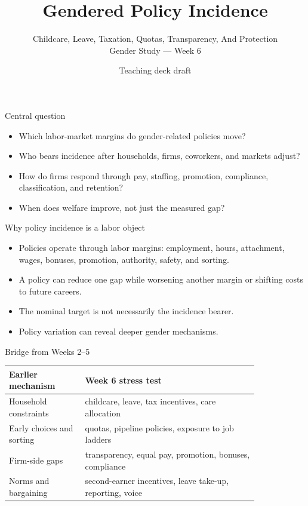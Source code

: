 \documentclass[aspectratio=169,11pt]{beamer}
\title{Gendered Policy Incidence}
\subtitle{Childcare, Leave, Taxation, Quotas, Transparency, And Protection\\Gender Study --- Week 6}
\author{Teaching deck draft}
\date{}
\begin{document}
\begin{frame}
  \titlepage
\end{frame}

\begin{frame}{Central question}
\begin{itemize}
    \item Which labor-market margins do gender-related policies move?
    \item Who bears incidence after households, firms, coworkers, and markets adjust?
    \item How do firms respond through pay, staffing, promotion, compliance, classification, and retention?
    \item When does welfare improve, not just the measured gap?
\end{itemize}
\end{frame}

\begin{frame}{Why policy incidence is a labor object}
\begin{itemize}
    \item Policies operate through labor margins: employment, hours, attachment, wages, bonuses, promotion, authority, safety, and sorting.
    \item A policy can reduce one gap while worsening another margin or shifting costs to future careers.
    \item The nominal target is not necessarily the incidence bearer.
    \item Policy variation can reveal deeper gender mechanisms.
\end{itemize}
\end{frame}

\begin{frame}{Bridge from Weeks 2--5}
\small
\begin{tabular}{p{0.25\linewidth} p{0.58\linewidth}}
\toprule
Earlier mechanism & Week 6 stress test \\
\midrule
Household constraints & childcare, leave, tax incentives, care allocation \\
Early choices and sorting & quotas, pipeline policies, exposure to job ladders \\
Firm-side gaps & transparency, equal pay, promotion, bonuses, compliance \\
Norms and bargaining & second-earner incentives, leave take-up, reporting, voice \\
\bottomrule
\end{tabular}
\end{frame}
\end{document}
